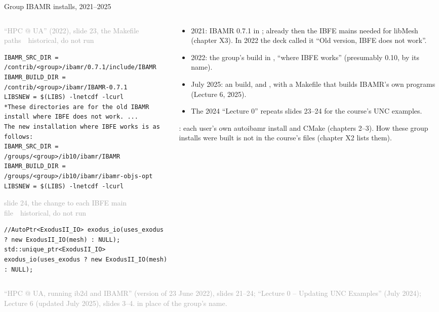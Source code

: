 \documentclass[aspectratio=169,11pt]{beamer}
\newcommand{\sourcecredit}[1]{\vfill\begin{flushright}\tiny\textcolor{DarkGray}{#1}\end{flushright}}
\newcommand{\hist}[1]{{\tiny\sffamily\textcolor{DarkGray}{#1\ \textbullet\ historical, do not run}}\par\nointerlineskip\vspace{0.3mm}}
\begin{document}
\begin{frame}[fragile]{Group IBAMR installs, 2021--2025}
\label{fr:groupinstalls}
\begin{columns}[T,onlytextwidth]
\begin{column}{0.53\textwidth}
\hist{``HPC @ UA'' (2022), slide 23, the Makefile paths}
\begin{lstlisting}[style=hist]
IBAMR_SRC_DIR = /contrib/<group>/ibamr/0.7.1/include/IBAMR
IBAMR_BUILD_DIR = /contrib/<group>/ibamr/IBAMR-0.7.1
LIBSNEW = $(LIBS) -lnetcdf -lcurl
*These directories are for the old IBAMR install where IBFE does not work. ...
The new installation where IBFE works is as follows:
IBAMR_SRC_DIR = /groups/<group>/ib10/ibamr/IBAMR
IBAMR_BUILD_DIR = /groups/<group>/ib10/ibamr/ibamr-objs-opt
LIBSNEW = $(LIBS) -lnetcdf -lcurl
\end{lstlisting}
\hist{slide 24, the change to each IBFE main file}
\begin{lstlisting}[style=hist]
//AutoPtr<ExodusII_IO> exodus_io(uses_exodus ? new ExodusII_IO(mesh) : NULL);
std::unique_ptr<ExodusII_IO> exodus_io(uses_exodus ? new ExodusII_IO(mesh) : NULL);
\end{lstlisting}
\end{column}
\begin{column}{0.44\textwidth}
\scriptsize
\begin{itemize}\setlength{\itemsep}{2pt}
  \item 2021: IBAMR 0.7.1 in ; already then the IBFE mains needed  for libMesh (chapter X3). In 2022 the deck called it ``Old version, IBFE does not work''.
  \item 2022: the group's  build in , ``where IBFE works'' (presumably 0.10, by its name).
  \item July 2025: an  build,  and , with a Makefile that builds IBAMR's own  programs (Lecture 6, 2025).
  \item The 2024 ``Lecture 0'' repeats slides 23--24 for the course's UNC examples.
\end{itemize}
\vspace{1mm}
: each user's own autoibamr install and CMake (chapters 2--3). How these group installs were built is not in the course's files (chapter X2 lists them).
\end{column}
\end{columns}
\sourcecredit{``HPC @ UA, running ib2d and IBAMR'' (version of 23 June 2022), slides 21--24; ``Lecture 0 -- Updating UNC Examples'' (July 2024); Lecture 6 (updated July 2025), slides 3--4. \code{<group>} in place of the group's name.}
\end{frame}
\end{document}
